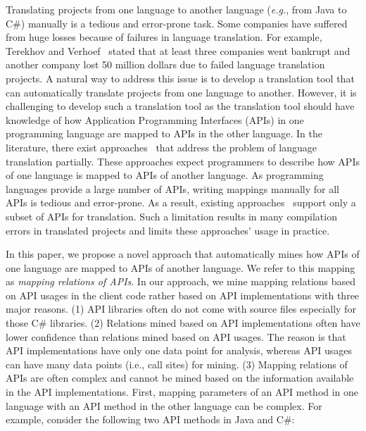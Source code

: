 Translating projects from one language to another language
(\emph{e.g.}, from Java to C\#) manually is a tedious and
error-prone task. Some companies have suffered from huge losses because
of failures in language translation. For example, Terekhov and
Verhoef~\cite{terekhov2000realities} stated that at least three
companies went bankrupt and another company lost 50 million dollars
due to failed language translation projects. A natural way to
address this issue is to develop a translation tool that can
automatically translate projects from one language to another.
However, it is challenging to develop such a translation tool as the
translation tool should have knowledge of how Application
Programming Interfaces (APIs) in one programming
language are mapped to APIs in the other language. In the literature, there exist
approaches~\cite{mossienko2003automated, yasumatsu1995spice,
hainaut2008migration} that address the problem of language
translation partially. These approaches expect programmers to
describe how APIs of one language is mapped to APIs of another
language.  As programming languages provide a large number of APIs,
writing mappings manually for all APIs is tedious and error-prone.
As a result, existing approaches~\cite{mossienko2003automated,yasumatsu1995spice,hainaut2008migration}
support only a subset of APIs for translation. Such a limitation
results in many compilation errors in translated projects and limits
these approaches' usage in practice.

In this paper, we propose a novel approach that automatically mines how APIs of
one language are mapped to APIs of another language. We refer to
this mapping as \emph{mapping relations of APIs}. In our approach,
we mine mapping relations based on API usages in the client
code rather based on API implementations with three major reasons.
(1) API libraries often do not come with source files especially for
those C\# libraries. (2) Relations mined based on API
implementations often have lower confidence than 
relations mined based on API usages. The reason is that API
implementations have only one data point for analysis, whereas
API usages can have many data points (i.e., call sites) for mining. (3) Mapping
relations of APIs are often complex and cannot be mined based
on the information available in the API implementations. First,
mapping parameters of an API method in one language with an API
method in the other language can be complex. For example, consider
the following two API methods in Java and C\#:

